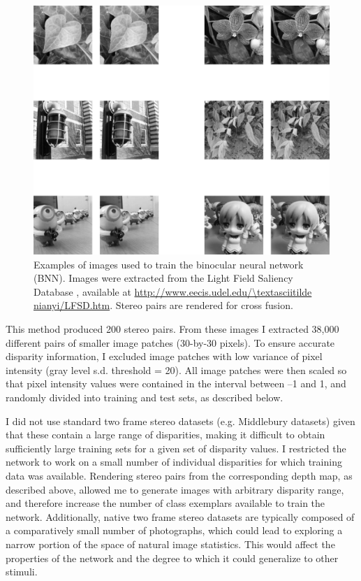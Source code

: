 \begin{figure}[!h]
  \centering
  \includegraphics{FigS1.png}
  \caption[Exemplars used to train the binocular neural network.]{Examples of images used to train the binocular neural network (BNN). Images were extracted from the Light Field Saliency Database \cite{Li:2014ik}, available at \url{http://www.eecis.udel.edu/\textasciitilde nianyi/LFSD.htm}. Stereo pairs are rendered for cross fusion.}
  \label{fig:c1fs1}
\end{figure}

This method produced 200 stereo pairs. From these images I extracted 38,000 different pairs of smaller image patches (30-by-30 pixels). To ensure accurate disparity information, I excluded image patches with low variance of pixel intensity (gray level s.d. threshold = 20). All image patches were then scaled so that pixel intensity values were contained in the interval between --1 and 1, and randomly divided into training and test sets, as described below. 

I did not use standard two frame stereo datasets (e.g. Middlebury datasets) given that these contain a large range of disparities, making it difficult to obtain sufficiently large training sets for a given set of disparity values. I restricted the network to work on a small number of individual disparities for which training data was available. Rendering stereo pairs from the corresponding depth map, as described above, allowed me to generate images with arbitrary disparity range, and therefore increase the number of class exemplars available to train the network. Additionally, native two frame stereo datasets are typically composed of a comparatively small number of photographs, which could lead to exploring a narrow portion of the space of natural image statistics. This would affect the properties of the network and the degree to which it could generalize to other stimuli. 

